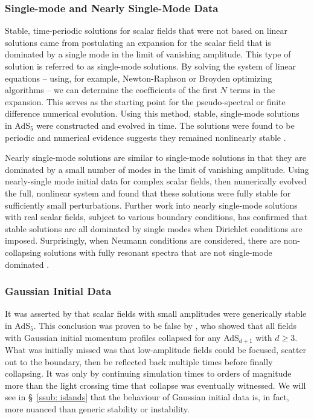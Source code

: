 \documentclass[../PhD.tex]{subfiles}
\begin{document}
\subsubsection{Single-mode and Nearly Single-Mode Data}

Stable, time-periodic solutions for scalar fields that were not based on linear solutions came from postulating an expansion for the scalar field that is dominated by a single mode in the limit of vanishing amplitude. This type of solution is referred to as single-mode solutions. By solving the system of linear equations -- using, for example, Newton-Raphson or Broyden optimizing algorithms -- we can determine the coefficients of the first $N$ terms in the expansion. This serves as the starting point for the pseudo-spectral or finite difference numerical evolution. Using this method, stable, single-mode solutions in AdS$_5$ were constructed and evolved in time. The solutions were found to be periodic and numerical evidence suggests they remained nonlinearly stable \cite{1303.3186}.

Nearly single-mode solutions are similar to single-mode solutions in that they are dominated by a small number of modes in the limit of vanishing amplitude. Using nearly-single mode initial data for complex scalar fields, \cite{1304.4166} then numerically evolved the full, nonlinear system and found that these solutions were fully stable for sufficiently small perturbations. Further work into nearly single-mode solutions with real scalar fields, subject to various boundary conditions, has confirmed that stable solutions are all dominated by single modes when Dirichlet conditions are imposed. Surprisingly, when Neumann conditions are considered, there are non-collapsing solutions with fully resonant spectra that are not single-mode dominated \cite{1908.02296}.

\subsubsection{Gaussian Initial Data}

It was asserted by \cite{1106.2339} that scalar fields with small amplitudes were generically stable in AdS$_5$. This conclusion was proven to be false by \cite{1108.4539}, who showed that all fields with Gaussian initial momentum profiles collapsed for any AdS$_{d+1}$ with $d \geq 3$. What was initially missed was that low-amplitude fields could be focused, scatter out to the boundary, then be reflected back multiple times before finally collapsing. It was only by continuing simulation times to orders of magnitude more than the light crossing time that collapse was eventually witnessed. We will see in \S~\!\ref{ssub: islands} that the behaviour of Gaussian initial data is, in fact, more nuanced than generic stability or instability.
\end{document}
